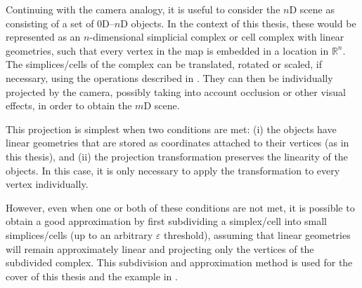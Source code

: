
Continuing with the camera analogy, it is useful to consider the $n$D scene as consisting of a set of 0D--$n$D objects.
In the context of this thesis, these would be represented as an $n$-dimensional simplicial complex or cell complex with linear geometries, such that every vertex in the map is embedded in a location in $\mathbb{R}^n$.
The simplices/cells of the complex can be translated, rotated or scaled, if necessary, using the operations described in .
They can then be individually projected by the camera, possibly taking into account occlusion or other visual effects, in order to obtain the $m$D scene.

This projection is simplest when two conditions are met: (i) the objects have linear geometries that are stored as coordinates attached to their vertices (as in this thesis), and (ii) the projection transformation preserves the linearity of the objects.
In this case, it is only necessary to apply the transformation to every vertex individually.

However, even when one or both of these conditions are not met, it is possible to obtain a good approximation by first subdividing a simplex/cell into small simplices/cells (up to an arbitrary $\varepsilon$ threshold), assuming that linear geometries will remain approximately linear and projecting only the vertices of the subdivided complex.
This subdivision and approximation method is used for the cover of this thesis and the example in .

